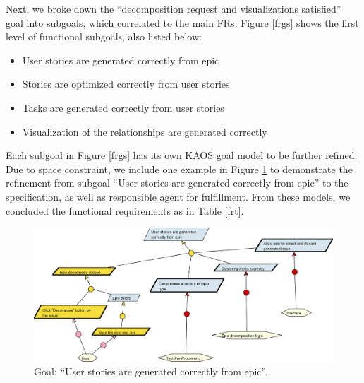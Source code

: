 Next, we broke down the “decomposition request and visualizations satisfied” goal into subgoals, which correlated to the main FRs. Figure \ref{frgs} shows the first level of functional subgoals, also listed below: 

\begin{itemize}
	\item User stories are generated correctly from epic
	\item Stories are optimized correctly from user stories
	\item Tasks are generated correctly from user stories
	\item Visualization of the relationships are generated correctly
\end{itemize}

Each subgoal in Figure \ref{frgs} has its own KAOS goal model to be further refined. Due to space constraint, we include one example in Figure \ref{fr1} to demonstrate the refinement from subgoal ``User stories are generated correctly from epic'' to the specification, as well as responsible agent for fulfillment.  From these models, we concluded the functional requirements as in Table \ref{frt}.

\begin{figure}
\centerline{\includegraphics[width=\textwidth,height=\textheight,keepaspectratio]{./figure/GoalsFR1.png}}
\caption{Goal: “User stories are generated correctly from epic”.}
\label{fr1}
\end{figure}

